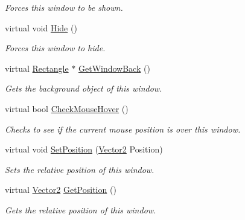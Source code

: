 \begin{DoxyCompactItemize}
\begin{DoxyCompactList}\small\item\em Forces this window to be shown. \item\end{DoxyCompactList}\item 
\hypertarget{classphys_1_1UI_1_1Window_a5eb51c6e1b2c440b52196fcf1022285e}{
virtual void \hyperlink{classphys_1_1UI_1_1Window_a5eb51c6e1b2c440b52196fcf1022285e}{Hide} ()}
\label{d4/d86/classphys_1_1UI_1_1Window_a5eb51c6e1b2c440b52196fcf1022285e}

\begin{DoxyCompactList}\small\item\em Forces this window to hide. \item\end{DoxyCompactList}\item 
virtual \hyperlink{classphys_1_1UI_1_1Rectangle}{Rectangle} $\ast$ \hyperlink{classphys_1_1UI_1_1Window_af06ae5666145e4d8835b38f4a9cbca2a}{GetWindowBack} ()
\begin{DoxyCompactList}\small\item\em Gets the background object of this window. \item\end{DoxyCompactList}\item 
virtual bool \hyperlink{classphys_1_1UI_1_1Window_a771bc9e43c0492ab179d8126c30665cf}{CheckMouseHover} ()
\begin{DoxyCompactList}\small\item\em Checks to see if the current mouse position is over this window. \item\end{DoxyCompactList}\item 
virtual void \hyperlink{classphys_1_1UI_1_1Window_ac49d7c2a12293cc80b289c653b55680d}{SetPosition} (\hyperlink{classphys_1_1Vector2}{Vector2} Position)
\begin{DoxyCompactList}\small\item\em Sets the relative position of this window. \item\end{DoxyCompactList}\item 
virtual \hyperlink{classphys_1_1Vector2}{Vector2} \hyperlink{classphys_1_1UI_1_1Window_a29fca96d9a2dab29d77a36d6a329f306}{GetPosition} ()
\begin{DoxyCompactList}\small\item\em Gets the relative position of this window. \item\end{DoxyCompactList}\item 

\end{DoxyCompactItemize}
